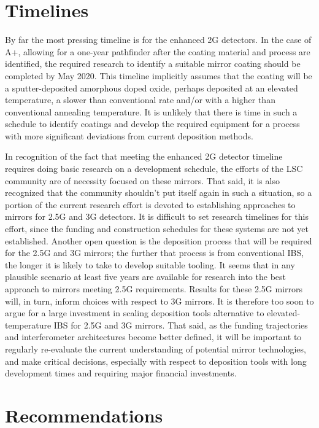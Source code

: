 \section{Timelines}

By far the most pressing timeline is for the enhanced 2G detectors. In the case of A+, allowing for a one-year pathfinder after the coating material and process are identified, the required research to identify a suitable mirror coating should be completed by May 2020. This timeline implicitly assumes that the coating will be a sputter-deposited amorphous doped oxide, perhaps deposited at an elevated temperature, a slower than conventional rate and/or with a higher than conventional annealing temperature. It is unlikely that there is time in such a schedule to identify coatings and develop the required equipment for a process with more significant deviations from current deposition methods.

In recognition of the fact that meeting the enhanced 2G detector timeline requires doing basic research on a development schedule, the efforts of the LSC community are of necessity focused on these mirrors. That said, it is also recognized that the community shouldn't put itself again in such a situation, so a portion of the current research effort is devoted to establishing approaches to mirrors for 2.5G and 3G detectors. It is difficult to set research timelines for this effort, since the funding and construction schedules for these systems are not yet established. Another open question is the deposition process that will be required for the 2.5G and 3G mirrors; the further that process is from conventional IBS, the longer it is likely to take to develop suitable tooling. It seems that in any plausible scenario at least five years are available for research into the best approach to mirrors meeting 2.5G requirements. Results for these 2.5G mirrors will, in turn, inform choices with respect to 3G mirrors. It is therefore too soon to argue for a large investment in scaling deposition tools alternative to elevated-temperature IBS for 2.5G and 3G mirrors. That said, as the funding trajectories and interferometer architectures become better defined, it will be important to regularly re-evaluate the current understanding of potential mirror technologies, and make critical decisions, especially with respect to deposition tools with long development times and requiring major financial investments.

\section{Recommendations}
\label{coatings_Recomm}

